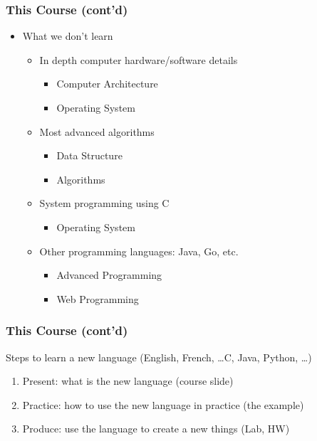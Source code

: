\documentclass{../c-lecture}
\begin{document}
\begin{frame}
  \frametitle{This Course (cont’d)}
  \begin{itemize}
    \item What we don’t learn
    \begin{itemize}
      \item In depth computer hardware/software details
      \begin{itemize}
        \color{Aquamarine}
        \item Computer Architecture
        \item Operating System
      \end{itemize}
      \pause%
      \item Most advanced algorithms
      \begin{itemize}
        \color{Aquamarine}
        \item Data Structure
        \item Algorithms
      \end{itemize}
      \pause%
      \item System programming using C
      \begin{itemize}
        \color{Aquamarine}
        \item Operating System
      \end{itemize}
      \pause%
      \item Other programming languages: Java, Go, etc.
      \begin{itemize}
        \color{Aquamarine}
        \item Advanced Programming
        \item Web Programming
      \end{itemize}
    \end{itemize}
  \end{itemize}
\end{frame}

\begin{frame}
  \frametitle{This Course (cont'd)}
  Steps to learn a new language (English, French, \ldots C, Java, Python, \ldots)

  \begin{enumerate}
    \item Present: what is the new language (course slide)
    \item Practice: how to use the new language in practice (the example)
    \item Produce: use the language to create a new things (Lab, HW)
  \end{enumerate}
\end{frame}
\end{document}
